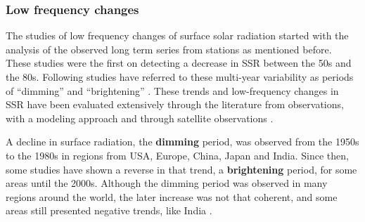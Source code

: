 

 

\subsubsection{Low frequency changes}

The studies of low frequency changes of surface solar radiation started with the analysis of the observed long term series from stations as mentioned before. These studies were the first on detecting a decrease in SSR between the 50s and the 80s. Following studies have referred to these multi-year variability as periods of ``dimming'' and ``brightening'' \cite*{Wild2012}. These trends and low-frequency changes in SSR have been evaluated extensively through the literature from observations, with a modeling approach and through satellite observations \cite*{Wilcox2013, Wild2005, Wild2009, Sanchez-Lorenzo2009, Mateos2014, Pfeifroth2017}.

A decline in surface radiation, the \textbf{dimming} period, was observed from the 1950s to the 1980s in regions from USA, Europe, China, Japan and India. Since then, some studies have shown a reverse in that trend, a \textbf{brightening} period, for some areas until the 2000s. Although the dimming period was observed in many regions around the world, the later increase was not that coherent, and some areas still presented negative trends, like India \cite*{Wild2012}.

